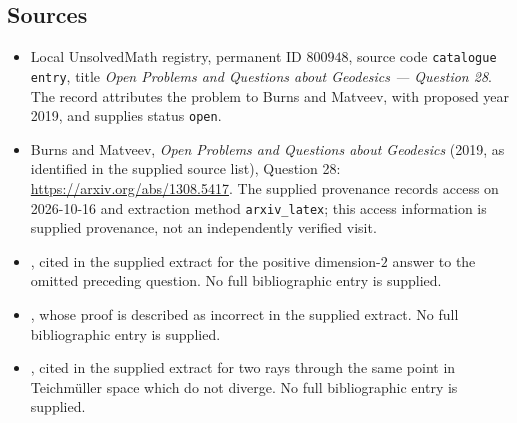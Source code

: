 \documentclass[11pt]{article}
\begin{document}
\subsection{Sources}
\begin{itemize}
\item Local UnsolvedMath registry, permanent ID \(800948\), source code \texttt{catalogue entry}, title \emph{Open Problems and Questions about Geodesics --- Question 28}. The record attributes the problem to Burns and Matveev, with proposed year 2019, and supplies status \texttt{open}.
\item Burns and Matveev, \emph{Open Problems and Questions about Geodesics} (2019, as identified in the supplied source list), Question 28: \url{https://arxiv.org/abs/1308.5417}. The supplied provenance records access on 2026-10-16 and extraction method \texttt{arxiv\_latex}; this access information is supplied provenance, not an independently verified visit.
\item [Green1954], cited in the supplied extract for the positive dimension-\(2\) answer to the omitted preceding question. No full bibliographic entry is supplied.
\item [Green1956], whose proof is described as incorrect in the supplied extract. No full bibliographic entry is supplied.
\item [Masur1975], cited in the supplied extract for two rays through the same point in Teichm\"uller space which do not diverge. No full bibliographic entry is supplied.
\end{itemize}
\end{document}

